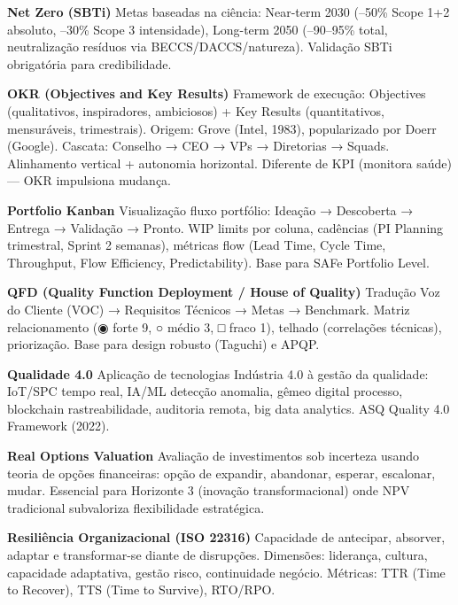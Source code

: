 \begin{ecglossario}
\item[\textbf{Net Zero (SBTi)}] Metas baseadas na ciência: Near-term 2030 (–50\% Scope 1+2 absoluto, –30\% Scope 3 intensidade), Long-term 2050 (–90–95\% total, neutralização resíduos via BECCS/DACCS/natureza). Validação SBTi obrigatória para credibilidade.

\item[\textbf{OKR (Objectives and Key Results)}] Framework de execução: Objectives (qualitativos, inspiradores, ambiciosos) + Key Results (quantitativos, mensuráveis, trimestrais). Origem: Grove (Intel, 1983), popularizado por Doerr (Google). Cascata: Conselho → CEO → VPs → Diretorias → Squads. Alinhamento vertical + autonomia horizontal. Diferente de KPI (monitora saúde) — OKR impulsiona mudança.

\item[\textbf{Portfolio Kanban}] Visualização fluxo portfólio: Ideação → Descoberta → Entrega → Validação → Pronto. WIP limits por coluna, cadências (PI Planning trimestral, Sprint 2 semanas), métricas flow (Lead Time, Cycle Time, Throughput, Flow Efficiency, Predictability). Base para SAFe Portfolio Level.

\item[\textbf{QFD (Quality Function Deployment / House of Quality)}] Tradução Voz do Cliente (VOC) → Requisitos Técnicos → Metas → Benchmark. Matriz relacionamento (◉ forte 9, ○ médio 3, □ fraco 1), telhado (correlações técnicas), priorização. Base para design robusto (Taguchi) e APQP.

\item[\textbf{Qualidade 4.0}] Aplicação de tecnologias Indústria 4.0 à gestão da qualidade: IoT/SPC tempo real, IA/ML detecção anomalia, gêmeo digital processo, blockchain rastreabilidade, auditoria remota, big data analytics. ASQ Quality 4.0 Framework (2022).

\item[\textbf{Real Options Valuation}] Avaliação de investimentos sob incerteza usando teoria de opções financeiras: opção de expandir, abandonar, esperar, escalonar, mudar. Essencial para Horizonte 3 (inovação transformacional) onde NPV tradicional subvaloriza flexibilidade estratégica.

\item[\textbf{Resiliência Organizacional (ISO 22316)}] Capacidade de antecipar, absorver, adaptar e transformar-se diante de disrupções. Dimensões: liderança, cultura, capacidade adaptativa, gestão risco, continuidade negócio. Métricas: TTR (Time to Recover), TTS (Time to Survive), RTO/RPO.


\end{ecglossario}
